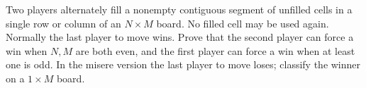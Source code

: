 Two players alternately fill a nonempty contiguous segment of unfilled cells in a single row or column of an $N\times M$ board. No filled cell may be used again. Normally the last player to move wins. Prove that the second player can force a win when $N,M$ are both even, and the first player can force a win when at least one is odd. In the misere version the last player to move loses; classify the winner on a $1\times M$ board.
